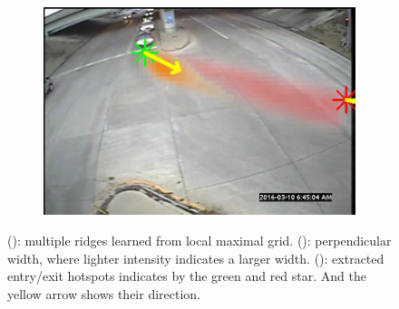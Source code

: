 \begin{figure}
\begin{subfigure}{0.32\linewidth}
        \includegraphics[width=\linewidth]{./img/scene_learning/res/middle/middle-1.jpg}
        \subcaption{}
        \label{subfig:scene-entry-exit}
    \end{subfigure}%
    \caption{(): multiple ridges learned from local maximal grid. (): perpendicular width, where lighter intensity indicates a larger width. (): extracted entry/exit hotspots indicates by the green and red star. And the yellow arrow shows their direction.}
    \label{fig:scene-ridge-res}
\end{figure}